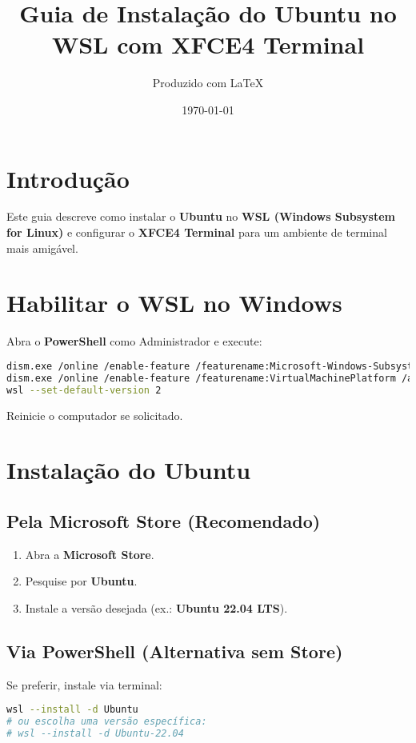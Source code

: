 \documentclass[12pt,a4paper]{article}
\title{Guia de Instalação do Ubuntu no WSL com XFCE4 Terminal}
\author{Produzido com \LaTeX}
\date{\today}
\begin{document}
\maketitle

\section{Introdução}
Este guia descreve como instalar o \textbf{Ubuntu} no \textbf{WSL (Windows Subsystem for Linux)} e configurar o \textbf{XFCE4 Terminal} para um ambiente de terminal mais amigável.

\section{Habilitar o WSL no Windows}

Abra o \textbf{PowerShell} como Administrador e execute:

\begin{lstlisting}[language=bash]
dism.exe /online /enable-feature /featurename:Microsoft-Windows-Subsystem-Linux /all /norestart
dism.exe /online /enable-feature /featurename:VirtualMachinePlatform /all /norestart
wsl --set-default-version 2
\end{lstlisting}

Reinicie o computador se solicitado.

\section{Instalação do Ubuntu}

\subsection{Pela Microsoft Store (Recomendado)}
\begin{enumerate}
    \item Abra a \textbf{Microsoft Store}.
    \item Pesquise por \textbf{Ubuntu}.
    \item Instale a versão desejada (ex.: \textbf{Ubuntu 22.04 LTS}).
\end{enumerate}

\subsection{Via PowerShell (Alternativa sem Store)}
Se preferir, instale via terminal:

\begin{lstlisting}[language=bash]
wsl --install -d Ubuntu
# ou escolha uma versão específica:
# wsl --install -d Ubuntu-22.04
\end{lstlisting}
\end{document}
